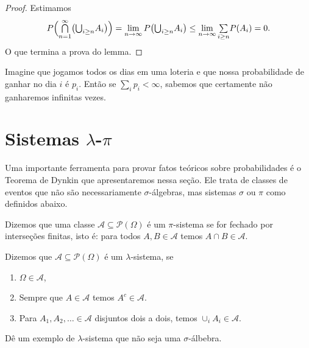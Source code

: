 \documentclass[../main/Notas_de_aula.tex]{subfiles}
\begin{document}
\begin{proof}
  Estimamos
  \begin{equation}
    P \Big( {\operatorname*{{\textstyle \bigcap}}_{n = 1}^\infty} \big({\operatorname*{{\textstyle \bigcup}}\nolimits_{i \geq n}} A_i \big) \Big) = \lim_{n\to \infty} P \big( {\operatorname*{{\textstyle \bigcup}}\nolimits_{i \geq n}} A_i \big) \leq \lim_{n\to \infty} {\textstyle\sum\limits_{i \geq n}} P(A_i) = 0.
  \end{equation}
  O que termina a prova do lemma.
\end{proof}

Imagine que jogamos todos os dias em uma loteria e que nossa probabilidade de ganhar no dia $i$ é $p_i$.
Então se $\sum_i p_i < \infty$, sabemos que certamente não ganharemos infinitas vezes.

\section{Sistemas \texorpdfstring{$\lambda$-$\pi$}{lambda-pi}}

Uma importante ferramenta para provar fatos teóricos sobre probabilidades é o Teorema de Dynkin que apresentaremos nessa seção.
Ele trata de classes de eventos que não são necessariamente $\sigma$-álgebras, mas sistemas $\sigma$ ou $\pi$ como definidos abaixo.

\begin{definition}
  Dizemos que uma classe $\mathcal{A} \subseteq \mathcal{P}(\Omega)$ é um $\pi$-sistema  se for fechado por interseções finitas, isto é: para todos $A, B \in \mathcal{A}$ temos $A \cap B \in \mathcal{A}$.
\end{definition}

\begin{definition}
  Dizemos que $\mathcal{A} \subseteq \mathcal{P}(\Omega)$ é um $\lambda$-sistema,  se
  \begin{enumerate}[\quad a)]
  \item $\Omega \in \mathcal{A}$,
  \item Sempre que $A \in \mathcal{A}$ temos $A^c \in \mathcal{A}$.
  \item Para $A_1, A_2, \dots \in \mathcal{A}$ disjuntos dois a dois, temos $\cup_i A_i \in \mathcal{A}$.
  \end{enumerate}
\end{definition}

\begin{exercise}
  \label{x:lambda_nao_sigma}
  Dê um exemplo de $\lambda$-sistema que não seja uma $\sigma$-álbebra.
\end{exercise}
\end{document}
